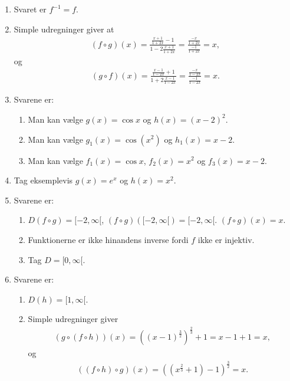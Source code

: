 \begin{enumerate}
	
	\item Svaret er $f^{-1}=f$.
	
	\item Simple udregninger giver at
	\begin{align*}
	(f\circ g)(x)=\frac{\frac{x+1}{1+2x}-1}{1-2\frac{x+1}{1+2x}}=\frac{\frac{-x}{1+2x}}{\frac{-1}{1+2x}}=x,
	\end{align*}
	og
	\begin{align*}
	(g\circ f)(x)=\frac{\frac{x-1}{1-2x}+1}{1+2\frac{x-1}{1-2x}}=\frac{\frac{-x}{1-2x}}{\frac{-1}{1-2x}}=x.
	\end{align*}
	
	\item Svarene er:
	\begin{enumerate}
		\item Man kan vælge $g(x)=\cos x$ og $h(x)=(x-2)^2$.
		\item Man kan vælge $g_1(x)=\cos(x^2)$ og $h_1(x)=x-2$.
		\item Man kan vælge $f_1(x)=\cos x$, $f_2(x)=x^2$ og $f_3(x)=x-2$.
	\end{enumerate}
	
	
	\item Tag eksemplevis $g(x)=e^x$ og $h(x)=x^2$.
	
	\item Svarene er:
	\begin{enumerate}
		\item $D(f\circ g)=[-2,\infty[$, $(f\circ g)([-2,\infty[)=[-2,\infty[$. $(f\circ g)(x)=x$.
		\item Funktionerne er ikke hinandens inverse fordi $f$ ikke er injektiv.
		\item Tag $D=[0,\infty[$.
	\end{enumerate}
	
		
	
	\item Svarene er: 
	\begin{enumerate}
		\item $D(h)=[1,\infty[$.
		\item Simple udregninger giver
		\begin{align*}
		(g\circ(f\circ h))(x)=((x-1)^{\frac{3}{2}})^{\frac{2}{3}}+1=x-1+1=x,
		\end{align*}
		og
		\begin{align*}
		((f \circ h)\circ g)(x)=((x^{\frac{2}{3}}+1)-1)^{\frac{3}{2}}=x.
		\end{align*}
		\end{enumerate}
	
	
	
	
\end{enumerate}